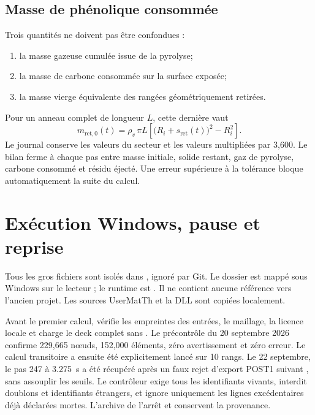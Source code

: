 \documentclass[oneside,openany]{amsdtx}
\begin{document}
\subsection{Masse de phénolique consommée}
Trois quantités ne doivent pas être confondues :
\begin{enumerate}[nosep]
\item la masse gazeuse cumulée issue de la pyrolyse;
\item la masse de carbone consommée sur la surface exposée;
\item la masse vierge équivalente des rangées géométriquement retirées.
\end{enumerate}
Pour un anneau complet de longueur \(L\), cette dernière vaut
\[
m_{\mathrm{ret},0}(t)=\rho_v\,\pi L
\left[\bigl(R_i+s_{\mathrm{ret}}(t)\bigr)^2-R_i^2\right].
\]
Le journal conserve les valeurs du secteur et les valeurs multipliées par
3,600. Le bilan ferme à chaque pas entre masse initiale, solide restant, gaz
de pyrolyse, carbone consommé et résidu éjecté. Une erreur supérieure à la
tolérance bloque automatiquement la suite du calcul.



\section{Exécution Windows, pause et reprise}
Tous les gros fichiers sont isolés dans , ignoré par Git. Le
dossier  est mappé sous Windows sur le lecteur ; le runtime
est . Il ne contient
aucune référence vers l'ancien projet. Les sources UserMatTh et la DLL sont
copiées localement.

Avant le premier calcul,  vérifie les empreintes
des entrées, le maillage, la licence locale  et charge le
deck complet sans . Le précontrôle du 20 septembre 2026 confirme
229,665 nœuds, 152,000 éléments, zéro avertissement et zéro erreur.
Le calcul transitoire a ensuite été explicitement lancé sur 10 rangs.
Le 22 septembre, le pas 247 à \SI{3.275}{s} a été récupéré après un faux rejet
d'export POST1 suivant , sans assouplir les seuils. Le contrôleur
exige tous les identifiants vivants, interdit doublons et identifiants étrangers,
et ignore uniquement les lignes excédentaires déjà déclarées mortes. L'archive
de l'arrêt et  conservent la provenance.
\end{document}
